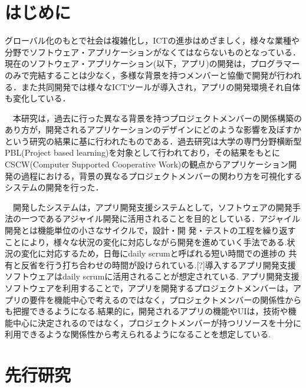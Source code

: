 \documentclass[submit,techrep]{ipsj}
\begin{document}
\maketitle

\section{はじめに}

グローバル化のもとで社会は複雑化し，ICTの進歩はめざましく，様々な業種や分野でソフトウェア・アプリケーションがなくてはならないものとなっている．現在のソフトウェア・アプリケーション(以下，アプリ)の開発は，プログラマーのみで完結することは少なく，多様な背景を持つメンバーと協働で開発が行われる．また共同開発では様々なICTツールが導入され，アプリの開発環境それ自体も変化している．


　本研究は，過去に行った異なる背景を持つプロジェクトメンバーの関係構築のあり方が，開発されるアプリケーションのデザインにどのような影響を及ぼすかという研究の結果に基に行われたものである．過去研究は大学の専門分野横断型PBL(Project based learning)を対象として行われており，その結果をもとにCSCW(Computer Supported Cooperative Work)の観点からアプリケーション開発の過程における，背景の異なるプロジェクトメンバーの関わり方を可視化するシステムの開発を行った．


　開発したシステムは，アプリ開発支援システムとして，ソフトウェアの開発手法の一つであるアジャイル開発に活用されることを目的としている．アジャイル開発とは機能単位の小さなサイクルで，設計・開 発・テストの工程を繰り返すことにより，様々な状況の変化に対応しながら開発を進めていく手法である.状況の変化に対応するため，日毎にdaily scrumと呼ばれる短い時間での進捗の 共有と反省を行う打ち合わせの時間が設けられている.[?]導入するアプリ開発支援ソフトウェアはdaily scrumに活用されることが想定されている.
アプリ開発支援ソフトウェアを利用することで，アプリを開発するプロジェクトメンバーは，アプリの要件を機能中心で考えるのではなく，プロジェクトメンバーの関係性からも把握できるようになる.結果的に，開発されるアプリの機能やUIは，技術や機能中心に決定されるのではなく，プロジェクトメンバーが持つリソースを十分に利用できるような関係性から考えられるようになることを想定している.

\section{先行研究}
\label{previous-research}
\end{document}
